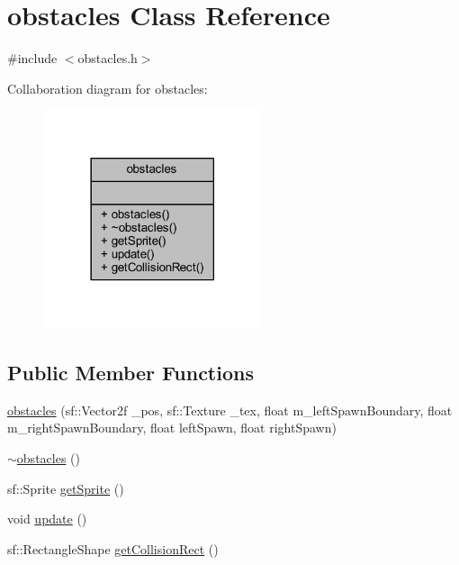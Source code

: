 \hypertarget{classobstacles}{}\section{obstacles Class Reference}
\label{classobstacles}


{\ttfamily \#include $<$obstacles.\+h$>$}



Collaboration diagram for obstacles\+:
\nopagebreak
\begin{figure}[H]
\begin{center}
\leavevmode
\includegraphics[width=182pt]{classobstacles__coll__graph}
\end{center}
\end{figure}
\subsection*{Public Member Functions}
\begin{DoxyCompactItemize}
\item 
\hyperlink{classobstacles_a73a39047ba35127248a8753926e05a06}{obstacles} (sf\+::\+Vector2f \+\_\+pos, sf\+::\+Texture \+\_\+tex, float m\+\_\+left\+Spawn\+Boundary, float m\+\_\+right\+Spawn\+Boundary, float left\+Spawn, float right\+Spawn)
\item 
\hyperlink{classobstacles_a7170fd3da6a296dd4690451bcd2627c5}{$\sim$obstacles} ()
\item 
sf\+::\+Sprite \hyperlink{classobstacles_a94bf656073cb771ce03b3b1aa783d21a}{get\+Sprite} ()
\item 
void \hyperlink{classobstacles_afebab4f703daedbb7b9140ce750b84bd}{update} ()
\item 
sf\+::\+Rectangle\+Shape \hyperlink{classobstacles_a5946a8ff28012b4b6b1a21c68fdd0655}{get\+Collision\+Rect} ()
\end{DoxyCompactItemize}


